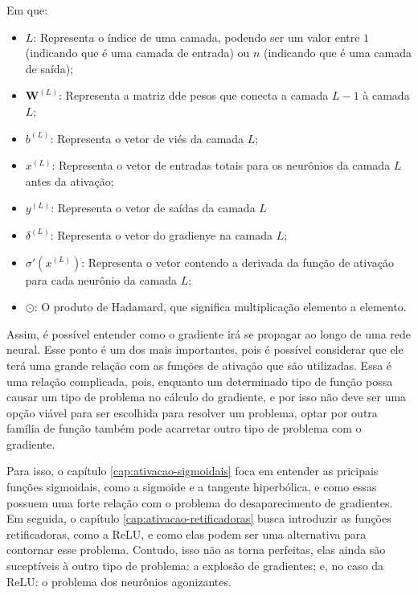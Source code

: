 Em que: 

\begin{itemize}
    \item $L$: Representa o índice de uma camada, podendo ser um valor entre $1$ (indicando que é uma camada de entrada) ou $n$ (indicando que é uma camada de saída);
    \item $\textbf{W}^{(L)}$: Representa a matriz dde pesos que conecta a camada $L - 1$ à camada $L$;
    \item $b^{(L)}$: Representa o vetor de viés da camada $L$;
    \item $x^{(L)}$: Representa o vetor de entradas totais para os neurônios da camada $L$ antes da ativação;
    \item $y^{(L)}$: Representa o vetor de saídas da camada $L$
    \item $\delta^{(L)}$: Representa o vetor do gradienye na camada $L$;
    \item $\sigma'(x^{(L)})$: Representa o vetor contendo a derivada da função de ativação para cada neurônio da camada $L$;
    \item $\odot$: O produto de Hadamard, que significa multiplicação elemento a elemento.
\end{itemize}

Assim, é possível entender como o gradiente irá se propagar ao longo de uma rede neural. Esse ponto é um dos mais importantes, pois é possível considerar que ele terá uma grande relação com as funções de ativação que são utilizadas. Essa é uma relação complicada, pois, enquanto um determinado tipo de função possa causar um tipo de problema no cálculo do gradiente, e por isso não deve ser uma opção viável para ser escolhida para resolver um problema, optar por outra família de função também pode acarretar outro tipo de problema com o gradiente.

Para isso, o capítulo \ref{cap:ativacao-sigmoidais} foca em entender as pricipais funções sigmoidais, como a sigmoide e a tangente hiperbólica, e como essas possuem uma forte relação com o problema do desaparecimento de gradientes. Em seguida, o capítulo \ref{cap:ativacao-retificadoras} busca introduzir as funções retificadoras, como a ReLU, e como elas podem ser uma alternativa para contornar esse problema. Contudo, isso não as torna perfeitas, elas ainda são suceptíveis à outro tipo de problema: a explosão de gradientes; e, no caso da ReLU: o problema dos neurônios agonizantes.


